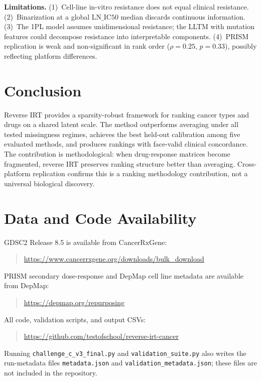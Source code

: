\documentclass[11pt]{article}
\begin{document}
\textbf{Limitations.} (1)~Cell-line in-vitro resistance does not equal clinical resistance. (2)~Binarization at a global $\text{LN\_IC50}$ median discards continuous information. (3)~The 1PL model assumes unidimensional resistance; the LLTM \citep{fischer1973,kang2026lltm} with mutation features could decompose resistance into interpretable components. (4)~PRISM replication is weak and non-significant in rank order ($\rho = 0.25$, $p = 0.33$), possibly reflecting platform differences.

\section{Conclusion}

Reverse IRT provides a sparsity-robust framework for ranking cancer types and drugs on a shared latent scale. The method outperforms averaging under all tested missingness regimes, achieves the best held-out calibration among five evaluated methods, and produces rankings with face-valid clinical concordance. The contribution is methodological: when drug-response matrices become fragmented, reverse IRT preserves ranking structure better than averaging. Cross-platform replication confirms this is a ranking methodology contribution, not a universal biological discovery.

\FloatBarrier
\section*{Data and Code Availability}

GDSC2 Release 8.5 is available from CancerRxGene:
\begin{quote}
\url{https://www.cancerrxgene.org/downloads/bulk_download}
\end{quote}
PRISM secondary dose-response and DepMap cell line metadata are available from DepMap:
\begin{quote}
\url{https://depmap.org/repurposing}
\end{quote}
All code, validation scripts, and output CSVs:
\begin{quote}
\url{https://github.com/testofschool/reverse-irt-cancer}
\end{quote}
Running \nolinkurl{challenge_c_v3_final.py} and \nolinkurl{validation_suite.py} also writes the run-metadata files \nolinkurl{metadata.json} and \nolinkurl{validation_metadata.json}; these files are not included in the repository.
\end{document}
